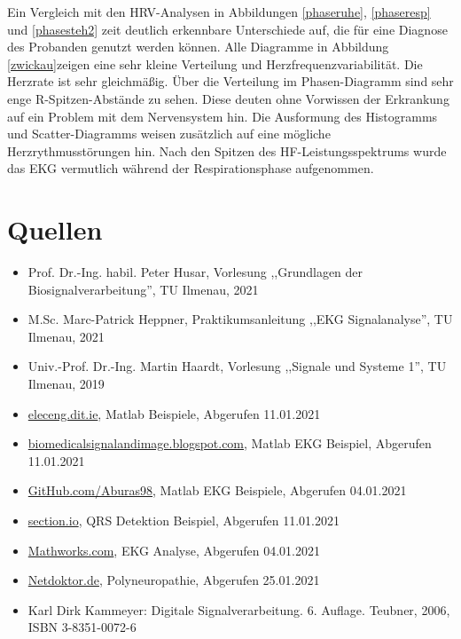 \documentclass[a4paper,12pt,titlepage]{scrartcl}
\begin{document}
Ein Vergleich mit den HRV-Analysen in Abbildungen \ref{phaseruhe}, \ref{phaseresp} und \ref{phasesteh2} zeit deutlich erkennbare Unterschiede auf, die für eine Diagnose des Probanden genutzt werden können. 
Alle Diagramme in Abbildung \ref{zwickau}zeigen eine sehr kleine Verteilung und Herzfrequenzvariabilität. Die Herzrate ist sehr gleichmäßig. Über die Verteilung im Phasen-Diagramm sind sehr enge R-Spitzen-Abstände zu sehen. Diese deuten ohne Vorwissen der Erkrankung auf ein Problem mit dem Nervensystem hin. Die Ausformung des Histogramms und Scatter-Diagramms weisen zusätzlich auf eine mögliche Herzrythmusstörungen hin. 
Nach den Spitzen des HF-Leistungsspektrums wurde das EKG vermutlich während der Respirationsphase aufgenommen.

\newpage
\section{Quellen}
\begin{itemize}
    \item Prof. Dr.-Ing. habil. Peter Husar, Vorlesung ,,Grundlagen der Biosignalverarbeitung'', TU Ilmenau, 2021
    \item M.Sc. Marc-Patrick Heppner, Praktikumsanleitung ,,EKG Signalanalyse'', TU Ilmenau, 2021
    \item Univ.-Prof. Dr.-Ing. Martin Haardt, Vorlesung ,,Signale und Systeme 1'', TU Ilmenau, 2019 
    \item \href{https://eleceng.dit.ie/dorran/matlab/resources/Matlab%20Signal%20Processing%20Examples.pdf}{eleceng.dit.ie}, Matlab Beispiele, Abgerufen 11.01.2021
    \item \href{https://biomedicalsignalandimage.blogspot.com/2016/02/matlab-code-to-plot-ecg-signal.html}{biomedicalsignalandimage.blogspot.com}, Matlab EKG Beispiel, Abgerufen 11.01.2021
    \item \href{https://github.com/Aburas98/MATLAB/}{GitHub.com/Aburas98}, Matlab EKG Beispiele, Abgerufen 04.01.2021
    \item \href{https://www.section.io/engineering-education/electrocardiograms-qrs-peak-and-heart-rate-detection-using-dwt-in-matlab/}{section.io}, QRS Detektion Beispiel, Abgerufen 11.01.2021
    \item \href{https://de.mathworks.com/help/dsp/ug/real-time-ecg-qrs-detection.html}{Mathworks.com}, EKG Analyse, Abgerufen 04.01.2021
    \item \href{https://www.netdoktor.de/krankheiten/polyneuropathie/}{Netdoktor.de}, Polyneuropathie, Abgerufen 25.01.2021
    \item Karl Dirk Kammeyer: Digitale Signalverarbeitung. 6. Auflage. Teubner, 2006, ISBN 3-8351-0072-6
\end{itemize}
\end{document}
